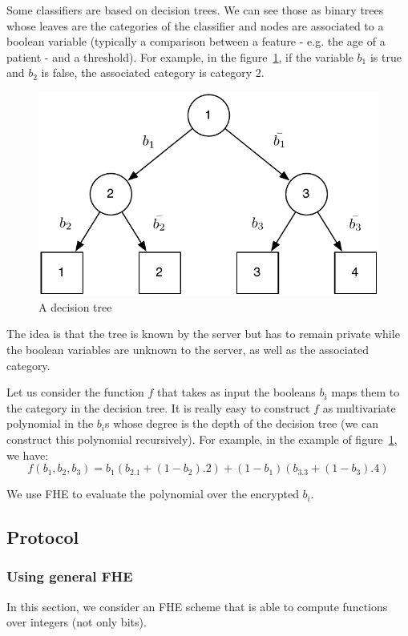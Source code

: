 \documentclass[11pt]{article}
\begin{document}
Some classifiers are based on decision trees. We can see those as binary trees whose leaves are the categories of the classifier and nodes are associated to a boolean variable (typically a comparison between a feature - e.g. the age of a patient - and a threshold). For example, in the figure~\ref{fig:decision_tree}, if the variable $b_1$ is true and $b_2$ is false, the associated category is category 2.   
\begin{figure}[h]
 \centering
	\includegraphics[scale=0.7]{decision_tree.pdf}
	\caption{A decision tree}
	 \label{fig:decision_tree}
\end{figure}

The idea is that the tree is known by the server but has to remain private while the boolean variables are unknown to the server, as well as the associated category.

Let us consider the function $f$ that takes as input the booleans $b_i$ maps them to the category in the decision tree. It is really easy to construct $f$ as multivariate polynomial in the $b_i$s whose degree is the depth of the decision tree (we can construct this polynomial recursively). For example, in the example of figure~\ref{fig:decision_tree}, we have:
\[
	f(b_1,b_2,b_3) = b_1(b_2.1 + (1-b_2).2) + (1-b_1)(b_3.3 + (1-b_3).4)
\]          

We use FHE to evaluate the polynomial over the encrypted $b_i$.

\subsection{Protocol} %
\label{sub:decision_tree_protocol}

\subsubsection{Using general FHE} %
\label{ssub:using_general_fhe}
	In this section, we consider an FHE scheme that is able to compute functions over integers (not only bits).
	
\end{document}
